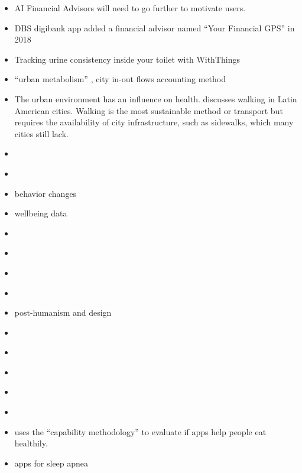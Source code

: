 \documentclass[
  letterpaper,
  DIV=11,
  numbers=noendperiod]{scrartcl}
\begin{document}
\begin{itemize}
\item
  AI Financial Advisors will need to go further to motivate users.
\item
  DBS digibank app added a financial advisor named ``Your Financial
  GPS'' in 2018 \citet{dbsDBSLaunchesSingapore2018}
\item
  Tracking urine consistency inside your toilet with WithThings
\item
  ``urban metabolism''
  \citep{shiUrbanInformatics2021, clairemoranWhatUrbanMetabolism2018},
  city in-out flows accounting method
\item
  The urban environment has an influence on health.
  \citet{delclos-alioWalkingTransportationLarge2022} discusses walking
  in Latin American cities. Walking is the most sustainable method or
  transport but requires the availability of city infrastructure, such
  as sidewalks, which many cities still lack.
\item
  \citet{tsaiTranslationValidationTaiwan2019}
\item
  \citet{burgerDevelopingSmartOperational2019}
\item
  \citet{aromatarioHowMobileHealth2019} behavior changes
\item
  \citet{ayoolaCHANGEPlatformServicebased2018} wellbeing data
\item
  \citet{godfreyWearableTechnologyExplained2018}
\item
  \citet{thomasExploringDigitalRemediation2018}
\item
  \citet{tonneNewFrontiersEnvironmental2017}
\item
  \citet{anselmaArtificialIntelligenceFramework2017}
\item
  \citet{forlanoPosthumanismDesign2017} post-humanism and design
\item
  \citet{greenbaumWhoOwnsYour2016}
\item
  \citet{millingsCanEffectivenessOnline2015}
\item
  \citet{reisIntegratingModellingSmart2015}
\item
  \citet{bowerWhatAreEducational2015}
\item
  \citet{fletcherFriendlyNoisySurveillance2022}
\item
  \citet{ryanEthicsDietaryApps2022} uses the ``capability methodology''
  to evaluate if apps help people eat healthily.
\item
  \citet{baptistaSystematicReviewSmartphone2022} apps for sleep apnea
\end{itemize}
\end{document}
